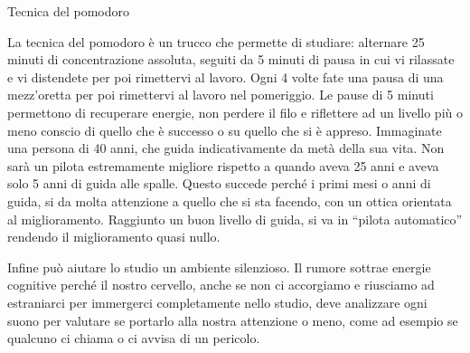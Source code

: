 \documentclass[12pt]{book} %
\begin{document}
\begin{mdframed}[linewidth=1pt]
Tecnica del pomodoro

La tecnica del pomodoro è un trucco che permette di studiare: alternare 25 minuti di concentrazione assoluta, seguiti da
5 minuti di pausa in cui vi rilassate e vi distendete per poi rimettervi al lavoro. Ogni 4 volte fate una pausa di una
mezz'oretta per poi rimettervi al lavoro nel pomeriggio. Le pause di 5 minuti permettono di
recuperare energie, non perdere il filo e riflettere ad un livello più o meno conscio di quello che è successo o su
quello che si è appreso. Immaginate
una persona di 40 anni, che guida indicativamente da metà della sua vita. Non sarà un pilota estremamente migliore
rispetto a quando aveva 25 anni e aveva solo 5 anni di guida alle spalle. Questo succede perché i primi mesi o anni di
guida, si da molta attenzione a quello che si sta facendo, con un ottica orientata al miglioramento. Raggiunto un buon
livello di guida, si va in “pilota automatico” rendendo il miglioramento quasi nullo.

Infine può aiutare lo studio un ambiente silenzioso. Il rumore sottrae energie
cognitive perché il nostro cervello, anche se non ci accorgiamo e riusciamo ad estraniarci per immergerci completamente
nello studio, deve analizzare ogni suono per valutare se portarlo alla nostra attenzione o meno, come ad esempio se
qualcuno ci chiama o ci avvisa di un pericolo.
\end{mdframed}
\end{document}
